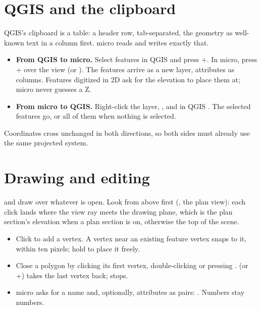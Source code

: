 \section{QGIS and the clipboard}\label{sec:polygons-qgis}

QGIS's clipboard is a table: a header row, tab-separated, the geometry as well-known text in a
 column first. micro reads and writes exactly that.

\begin{itemize}
\item \textbf{From QGIS to micro.} Select features in QGIS and press +. In micro,
  press + over the view (or ). The features
  arrive as a new layer, attributes as columns. Features digitized in 2D ask for the elevation to
  place them at; micro never guesses a Z.
\item \textbf{From micro to QGIS.} Right-click the layer, , and in QGIS . The selected features go,
  or all of them when nothing is selected.
\end{itemize}

Coordinates cross unchanged in both directions, so both sides must already use the same projected
system.

\section{Drawing and editing}\label{sec:polygons-draw}

 and  draw over whatever is open. Look from above
first (, the plan view): each click lands where the view ray meets the drawing
plane, which is the plan section's elevation when a plan section is on, otherwise the top of the
scene.

\begin{itemize}
\item Click to add a vertex. A vertex near an existing feature vertex snaps to it, within ten pixels;
  hold  to place it freely.
\item Close a polygon by clicking its first vertex, double-clicking or pressing .
   (or +) takes the last vertex back;  stops.
\item micro asks for a name and, optionally, attributes as  pairs:
  . Numbers stay numbers.
\end{itemize}

